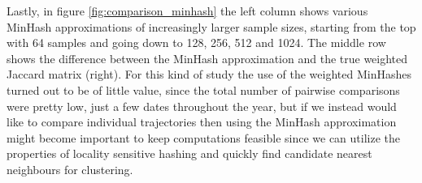\documentclass[../main.tex]{subfiles}
\begin{document}
Lastly, in figure \ref{fig:comparison_minhash} the left column shows various MinHash approximations of increasingly larger sample sizes, starting from the top with 64 samples and going down to 128, 256, 512 and 1024. The middle row shows the difference between the MinHash approximation and the true weighted Jaccard matrix (right). For this kind of study the use of the weighted MinHashes turned out to be of little value, since the total number of pairwise comparisons were pretty low, just a few dates throughout the year, but if we instead would like to compare individual trajectories then using the MinHash approximation might become important to keep computations feasible since we can utilize the properties of locality sensitive hashing and quickly find candidate nearest neighbours for clustering.
\end{document}
